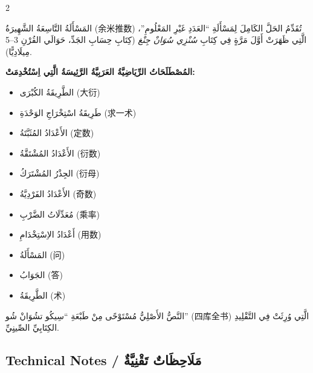 \documentclass[11pt,a4paper]{article}
\newcommand{\ar}[1]{\arabicfont\beginR #1\endR}
\newenvironment{bilingual}{%
  \begin{paracol}{2}
}{%
  \end{paracol}
}
\begin{document}
\begin{bilingual}
\begin{rightcolumn*}
\ar{المَسْأَلَةُ التَّاسِعَةُ الشَّهِيرَةُ (余米推数) تُقَدِّمُ الحَلَّ الكَامِلَ لِمَسْأَلَةِ \enquote{العَدَدِ غَيْرِ المَعْلُومِ}، الَّتِي ظَهَرَتْ أَوَّلَ مَرَّةٍ فِي كِتَابِ \textit{سُنْزِي سُوَانْ جِنْغ} (كِتَابِ حِسَابِ الجَدِّ، حَوَالَي القُرْنِ 3--5 مِيلَادِيًّا).}

\ar{\textbf{المُصْطَلَحَاتُ الرِّيَاضِيَّةُ العَرَبِيَّةُ الرَّئِيسَةُ الَّتِي اِسْتُخْدِمَتْ:}}
\begin{itemize}
  \item \ar{الطَّرِيقَةُ الكُبْرَى (大衍)}
  \item \ar{طَرِيقَةُ اسْتِخْرَاجِ الوَحْدَةِ (求一术)}
  \item \ar{الأَعْدَادُ المُثَبَّتَةُ (定数)}
  \item \ar{الأَعْدَادُ المُشْتَقَّةُ (衍数)}
  \item \ar{الجِذْرُ المُشْتَرَكُ (衍母)}
  \item \ar{الأَعْدَادُ الفَرْدِيَّةُ (奇数)}
  \item \ar{مُعَدِّلَاتُ الضَّرْبِ (乘率)}
  \item \ar{أَعْدَادُ الاِسْتِخْدَامِ (用数)}
  \item \ar{المَسْأَلَةُ (问)}
  \item \ar{الجَوَابُ (答)}
  \item \ar{الطَّرِيقَةُ (术)}
\end{itemize}

\ar{النَّصُّ الأَصْلِيُّ مُسْتَوْحًى مِنْ طَبْعَةِ \enquote{سِيكُو تشُوَانْ شُو} (四库全书) الَّتِي وُرِثَتْ فِي التَّقْلِيدِ الكِتَابِيِّ الصِّينِِيِّ.}
\end{rightcolumn*}

\end{bilingual}

\vspace{1em}

\subsection*{Technical Notes / \ar{مَلَاحِظَاتٌ تَقْنِيَّةٌ}}
\end{document}
